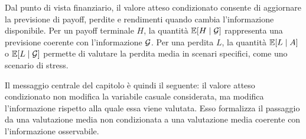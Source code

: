 Dal punto di vista finanziario, il valore atteso condizionato consente di
aggiornare la previsione di payoff, perdite e rendimenti quando cambia
l'informazione disponibile. Per un payoff terminale $H$, la quantit\`{a}
$\mathbb{E}[H\mid\mathcal{G}]$ rappresenta una previsione coerente con
l'informazione $\mathcal{G}$. Per una perdita $L$, la quantit\`{a}
$\mathbb{E}[L\mid A]$ o $\mathbb{E}[L\mid\mathcal{G}]$ permette di valutare la
perdita media in scenari specifici, come uno scenario di stress.

Il messaggio centrale del capitolo \`{e} quindi il seguente: il valore atteso
condizionato non modifica la variabile casuale considerata, ma modifica
l'informazione rispetto alla quale essa viene valutata. Esso formalizza il
passaggio da una valutazione media non condizionata a una valutazione media
coerente con l'informazione osservabile.
